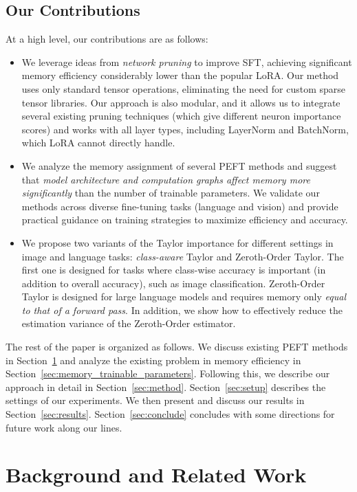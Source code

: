 \subsection{Our Contributions}\label{sec:our-results}
At a high level, our contributions are as follows:
\begin{itemize}
    \item We leverage ideas from \emph{network pruning} to improve SFT, achieving significant memory efficiency considerably lower than the popular LoRA. Our method uses only standard tensor operations, eliminating the need for custom sparse tensor libraries. Our approach is also modular, and it allows us to integrate several existing pruning techniques (which give different neuron importance scores) and works with all layer types, including LayerNorm and BatchNorm, which LoRA cannot directly handle. 
    \item We analyze the memory assignment of several PEFT methods and suggest that \emph{model architecture and computation graphs affect memory more significantly} than the number of trainable parameters. We validate our methods across diverse fine-tuning tasks (language and vision) and provide practical guidance on training strategies to maximize efficiency and accuracy. 
    \item We propose two variants of the Taylor importance for different settings in image and language tasks: \emph{class-aware} Taylor and Zeroth-Order Taylor. The first one is designed for tasks where class-wise accuracy is important (in addition to overall accuracy), such as image classification. Zeroth-Order Taylor is designed for large language models and requires memory only \emph{equal to that of a forward pass}. In addition, we show how to effectively reduce the estimation variance of the Zeroth-Order estimator.
\end{itemize}

The rest of the paper is organized as follows. We discuss existing PEFT methods in Section~\ref{sec:related} and analyze the existing problem in memory efficiency in Section~\ref{sec:memory_trainable_parameters}. Following this, we describe our approach in detail in Section~\ref{sec:method}. Section~\ref{sec:setup} describes the settings of our experiments. We then present and discuss our results in Section~\ref{sec:results}. Section~\ref{sec:conclude} concludes with some directions for future work along our lines.

\section{Background and Related Work}\label{sec:related}

